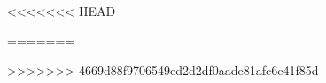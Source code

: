 \documentclass{article}
\begin{document}
\thispagestyle{firstpage}
\espacioinicial

\setcounter{tocdepth}{1} %
\begin{cuadrocontenido}
  \tableofcontents
\end{cuadrocontenido}

<<<<<<< HEAD




\newpage







=======

>>>>>>> 4669d88f9706549ed2d2df0aade81afc6c41f85d
\end{document}
